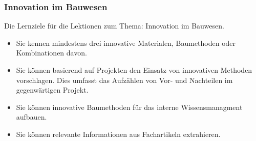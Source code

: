 \subsubsection*{Innovation im Bauwesen}
Die Lernziele für die Lektionen zum Thema: Innovation im Bauwesen.
\begin{itemize}
	\item Sie kennen mindestens drei innovative Materialen, Baumethoden oder Kombinationen davon. 
	\item Sie können basierend auf Projekten den Einsatz von innovativen Methoden vorschlagen. Dies umfasst das Aufzählen von Vor- und Nachteilen im gegenwärtigen Projekt.
	\item Sie können innovative Baumethoden für das interne Wissensmanagment aufbauen.
	\item Sie können relevante Informationen aus Fachartikeln extrahieren.
\end{itemize}